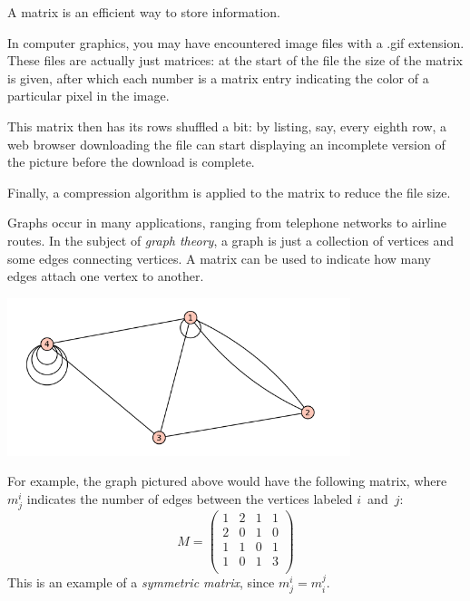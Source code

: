 A matrix is  an efficient way to store information.

\begin{example}
In computer graphics, you may have encountered image files with a .gif extension.  These files are actually just matrices: at the start of the file the size of the matrix is given, after which each number is a matrix entry  indicating the color of a particular pixel in the image.

This matrix  then has its rows shuffled a bit: by listing, say, every eighth row, a web browser downloading the file can start displaying an incomplete version of the picture before the download is complete.

Finally, a compression algorithm is applied to the matrix to reduce the file size.
\end{example}



\begin{example}
Graphs occur in many applications, ranging from telephone networks to airline routes.  In the subject of \emph{graph theory}, a graph is just a collection of vertices and some edges connecting vertices.  A matrix can be used to indicate how many edges attach one vertex to another.

\begin{center}
\includegraphics[alt={Four vertices (dots).  Dots 1 and 3 are singly connected.  Dots 1 and 4 are singly connected.  Dots 2 and 3 are singly connected.  Dots 1 and 2 are doubly connected.  Dot 1 has a loop.  Dot 4 has three loops.},width=10cm]{notes8-0.png}
\end{center}
For example, the graph pictured above would have the following matrix, where $m^i_j$ indicates the number of edges between the vertices labeled $i$~and~$j$:
\[
M = \begin{pmatrix}
1 & 2 & 1 & 1 \\
2 & 0 & 1 & 0 \\
1 & 1 & 0 & 1 \\
1 & 0 & 1 & 3 \\
\end{pmatrix}
\]
This is an example of a \emph{symmetric matrix}, since $m_j^i = m_i^j$.

\end{example}

